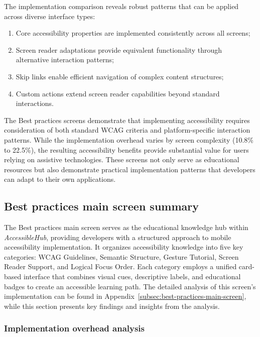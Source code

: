 The implementation comparison reveals robust patterns that can be applied across diverse interface types:
\begin{enumerate}
    \item Core accessibility properties are implemented consistently across all screens;
    
    \item Screen reader adaptations provide equivalent functionality through alternative interaction patterns;
    
    \item Skip links enable efficient navigation of complex content structures;
    
    \item Custom actions extend screen reader capabilities beyond standard interactions.
\end{enumerate}

The Best practices screens demonstrate that implementing accessibility requires consideration of both standard WCAG criteria and platform-specific interaction patterns. While the implementation overhead varies by screen complexity (10.8\% to 22.5\%), the resulting accessibility benefits provide substantial value for users relying on assistive technologies. These screens not only serve as educational resources but also demonstrate practical implementation patterns that developers can adapt to their own applications.

\subsection{Best practices main screen summary}
\label{subsec:best-practices-summary}

The Best practices main screen serves as the educational knowledge hub within \textit{AccessibleHub}, providing developers with a structured approach to mobile accessibility implementation. It organizes accessibility knowledge into five key categories: WCAG Guidelines, Semantic Structure, Gesture Tutorial, Screen Reader Support, and Logical Focus Order. Each category employs a unified card-based interface that combines visual cues, descriptive labels, and educational badges to create an accessible learning path. The detailed analysis of this screen's implementation can be found in Appendix~\ref{subsec:best-practices-main-screen}, while this section presents key findings and insights from the analysis.

\subsubsection{Implementation overhead analysis}
\label{subsubsec:best-practices-overhead-summary}

